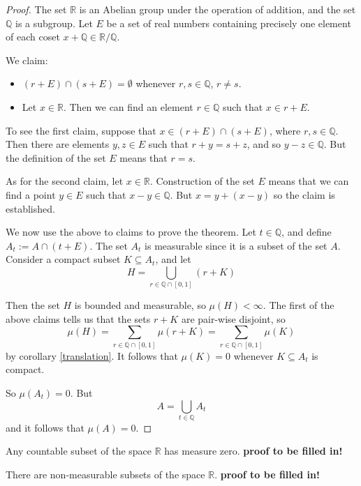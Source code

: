 \begin{proof}
The set $\mathbb R$ is an Abelian group under the operation of addition, and the set $\mathbb Q$ is a subgroup.  Let $E$ be a set of real numbers containing precisely one element of each coset $x+ {\mathbb Q} \in {\mathbb R}/{\mathbb Q}$.

We claim:

\begin{itemize}

\item $(r+E)\cap (s+E) = \emptyset$ whenever $r,s\in {\mathbb Q}$, $r\neq s$.

\item Let $x\in {\mathbb R}$.  Then we can find an element $r\in {\mathbb Q}$ such that $x\in r+E$.

\end{itemize}

To see the first claim, suppose that $x\in (r+E)\cap (s+E)$, where $r,s\in {\mathbb Q}$.  Then there are elements $y,z\in E$ such that $r+y = s+z$, and so $y-z\in {\mathbb Q}$.  But the definition of the set $E$ means that $r=s$.

As for the second claim, let $x\in {\mathbb R}$.  Construction of the set $E$ means that we can find a point $y\in E$ such that $x-y \in {\mathbb Q}$.  But $x = y + (x-y)$ so the claim is established.

We now use the above to claims to prove the theorem.  Let $t\in {\mathbb Q}$, and define $A_t := A\cap (t+E)$.  The set $A_t$ is measurable since it is a subset of the set $A$.  Consider a compact subset $K\subseteq A_t$, and let
$$H = \bigcup_{r\in {\mathbb Q}\cap [0,1]} (r+K)$$

Then the set $H$ is bounded and measurable, so $\mu (H)<\infty$.  The first of the above claims tells us that the sets $r+K$ are pair-wise disjoint, so
$$\mu (H) = \sum_{r\in {\mathbb Q}\cap [0,1]} \mu (r+K) = \sum_{r\in {\mathbb Q}\cap [0,1]} \mu (K)$$
by corollary \ref{translation}.  It follows that $\mu (K)=0$ whenever $K\subseteq A_t$ is compact.

So $\mu (A_t) =0$.  But
$$A = \bigcup_{t\in {\mathbb Q}} A_t$$
and it follows that $\mu (A)=0$.
\end{proof}

\begin{corollary}
Any countable subset of the space ${\mathbb R}$ has measure zero.
\textbf{proof to be filled in!}
\end{corollary}

\begin{corollary}
There are non-measurable subsets of the space $\mathbb R$.
\textbf{proof to be filled in!}
\end{corollary}

